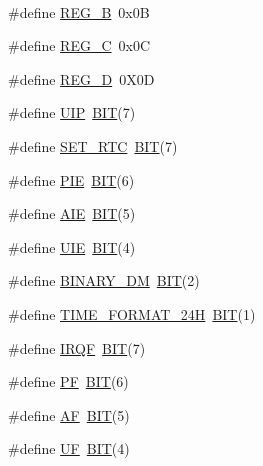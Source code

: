 \begin{DoxyCompactItemize}
$$\item 
\#define \mbox{\hyperlink{group__rtc_ga28ed75c6727784e56c2bb8d828c876c9}{R\+E\+G\+\_\+B}}~0x0B
\item 
\#define \mbox{\hyperlink{group__rtc_ga088e580de0961d5f30eb3366f97b324c}{R\+E\+G\+\_\+C}}~0x0C
\item 
\#define \mbox{\hyperlink{group__rtc_ga8f2a2da8b96e20112d3f225636392424}{R\+E\+G\+\_\+D}}~0\+X0D
\item 
\#define \mbox{\hyperlink{group__rtc_ga3289eebd69837790d4aacaccd18d46db}{U\+IP}}~\mbox{\hyperlink{group__vbe_ga3a8ea58898cb58fc96013383d39f482c}{B\+IT}}(7)
\item 
\#define \mbox{\hyperlink{group__rtc_ga7ebe68dabb3864696a8a466499fbc37d}{S\+E\+T\+\_\+\+R\+TC}}~\mbox{\hyperlink{group__vbe_ga3a8ea58898cb58fc96013383d39f482c}{B\+IT}}(7)
\item 
\#define \mbox{\hyperlink{group__rtc_gac40c2b49eb51e2adc237b530adfcadf4}{P\+IE}}~\mbox{\hyperlink{group__vbe_ga3a8ea58898cb58fc96013383d39f482c}{B\+IT}}(6)
\item 
\#define \mbox{\hyperlink{group__rtc_ga113847820d539c6a6836993b84d22800}{A\+IE}}~\mbox{\hyperlink{group__vbe_ga3a8ea58898cb58fc96013383d39f482c}{B\+IT}}(5)
\item 
\#define \mbox{\hyperlink{group__rtc_ga2c276876faf62c1b29fe2383ce4ccfda}{U\+IE}}~\mbox{\hyperlink{group__vbe_ga3a8ea58898cb58fc96013383d39f482c}{B\+IT}}(4)
\item 
\#define \mbox{\hyperlink{group__rtc_ga96df1c1afaaa70a1b805c83bad18ff26}{B\+I\+N\+A\+R\+Y\+\_\+\+DM}}~\mbox{\hyperlink{group__vbe_ga3a8ea58898cb58fc96013383d39f482c}{B\+IT}}(2)
\item 
\#define \mbox{\hyperlink{group__rtc_ga70514fa1fe27f2ca52b651ff16ed0069}{T\+I\+M\+E\+\_\+\+F\+O\+R\+M\+A\+T\+\_\+24H}}~\mbox{\hyperlink{group__vbe_ga3a8ea58898cb58fc96013383d39f482c}{B\+IT}}(1)
\item 
\#define \mbox{\hyperlink{group__rtc_ga8565773f11252b9d615f1b12ac73032d}{I\+R\+QF}}~\mbox{\hyperlink{group__vbe_ga3a8ea58898cb58fc96013383d39f482c}{B\+IT}}(7)
\item 
\#define \mbox{\hyperlink{group__rtc_gaa0e278c26c25558741febfadd7216caa}{PF}}~\mbox{\hyperlink{group__vbe_ga3a8ea58898cb58fc96013383d39f482c}{B\+IT}}(6)
\item 
\#define \mbox{\hyperlink{group__rtc_ga76ba789cde9c36cd57dbb390bdee7661}{AF}}~\mbox{\hyperlink{group__vbe_ga3a8ea58898cb58fc96013383d39f482c}{B\+IT}}(5)
\item 
\#define \mbox{\hyperlink{group__rtc_ga2657a76f02e47fa3f3320fa9c6353f31}{UF}}~\mbox{\hyperlink{group__vbe_ga3a8ea58898cb58fc96013383d39f482c}{B\+IT}}(4)
\end{DoxyCompactItemize}
